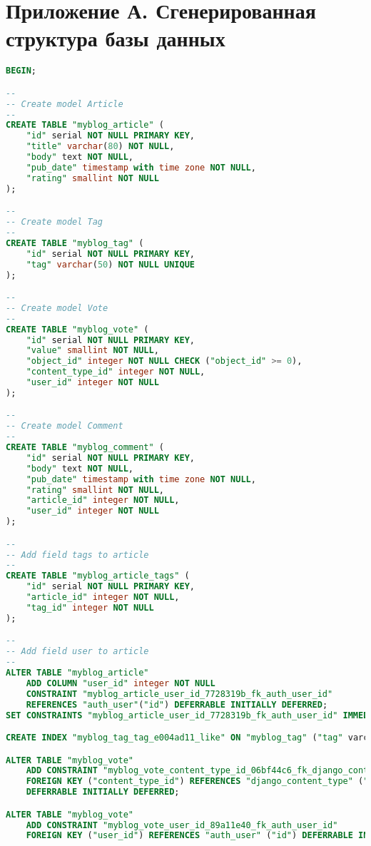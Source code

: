 \chapter*{Приложение А. Сгенерированная структура базы данных}
\label{chp:attachment-a}

\begin{lstlisting}[caption={Сгенерированная структура базы данных}, label={lst:sqlmigrate}, language=SQL]
BEGIN;

--
-- Create model Article
--
CREATE TABLE "myblog_article" (
	"id" serial NOT NULL PRIMARY KEY,
	"title" varchar(80) NOT NULL,
	"body" text NOT NULL,
	"pub_date" timestamp with time zone NOT NULL,
	"rating" smallint NOT NULL
);

--
-- Create model Tag
--
CREATE TABLE "myblog_tag" (
	"id" serial NOT NULL PRIMARY KEY,
	"tag" varchar(50) NOT NULL UNIQUE
);

--
-- Create model Vote
--
CREATE TABLE "myblog_vote" (
	"id" serial NOT NULL PRIMARY KEY,
	"value" smallint NOT NULL,
	"object_id" integer NOT NULL CHECK ("object_id" >= 0),
	"content_type_id" integer NOT NULL,
	"user_id" integer NOT NULL
);

--
-- Create model Comment
--
CREATE TABLE "myblog_comment" (
	"id" serial NOT NULL PRIMARY KEY,
	"body" text NOT NULL,
	"pub_date" timestamp with time zone NOT NULL,
	"rating" smallint NOT NULL,
	"article_id" integer NOT NULL,
	"user_id" integer NOT NULL
);

--
-- Add field tags to article
--
CREATE TABLE "myblog_article_tags" (
	"id" serial NOT NULL PRIMARY KEY,
	"article_id" integer NOT NULL,
	"tag_id" integer NOT NULL
);

--
-- Add field user to article
--
ALTER TABLE "myblog_article"
	ADD COLUMN "user_id" integer NOT NULL
	CONSTRAINT "myblog_article_user_id_7728319b_fk_auth_user_id"
	REFERENCES "auth_user"("id") DEFERRABLE INITIALLY DEFERRED;
SET CONSTRAINTS "myblog_article_user_id_7728319b_fk_auth_user_id" IMMEDIATE;

CREATE INDEX "myblog_tag_tag_e004ad11_like" ON "myblog_tag" ("tag" varchar_pattern_ops);

ALTER TABLE "myblog_vote"
	ADD CONSTRAINT "myblog_vote_content_type_id_06bf44c6_fk_django_content_type_id"
	FOREIGN KEY ("content_type_id") REFERENCES "django_content_type" ("id")
	DEFERRABLE INITIALLY DEFERRED;

ALTER TABLE "myblog_vote"
	ADD CONSTRAINT "myblog_vote_user_id_89a11e40_fk_auth_user_id"
	FOREIGN KEY ("user_id") REFERENCES "auth_user" ("id") DEFERRABLE INITIALLY DEFERRED;


\end{lstlisting}
